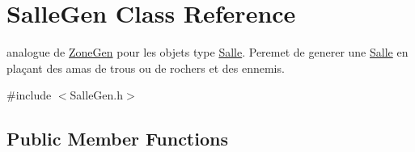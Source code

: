 \hypertarget{classSalleGen}{}\section{Salle\+Gen Class Reference}
\label{classSalleGen}


analogue de \hyperlink{classZoneGen}{Zone\+Gen} pour les objets type \hyperlink{classSalle}{Salle}. Peremet de generer une \hyperlink{classSalle}{Salle} en plaçant des amas de trous ou de rochers et des ennemis.  




{\ttfamily \#include $<$Salle\+Gen.\+h$>$}

\subsection*{Public Member Functions}
